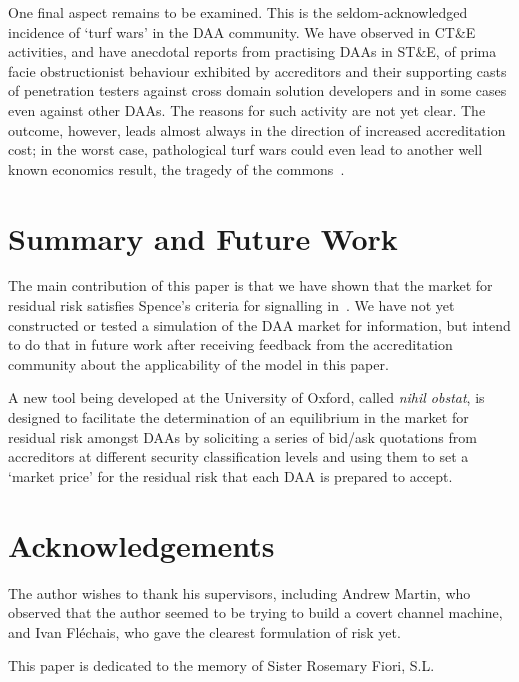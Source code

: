 \documentclass{llncs}
\begin{document}
One final aspect remains to be examined.  This is the seldom-acknowledged
incidence of `turf wars' in the DAA community.  We have
observed in CT\&E activities, and have anecdotal reports from
practising DAAs in ST\&E, of prima facie obstructionist behaviour exhibited
by accreditors and their supporting casts of penetration testers
against cross domain solution developers and in some cases even against other DAAs.
The reasons for such activity are not yet clear.  The outcome, however,
leads almost always in the direction of increased accreditation cost; in
the worst case, pathological turf wars could even lead to another well known
economics result, the tragedy of the commons~\cite{Hardin1968}.

\section{Summary and Future Work}

The main contribution of this paper is that we have shown
that the market for residual risk satisfies Spence's criteria for signalling
in~\cite{Spence1973}.  We have not yet constructed or tested a simulation
of the DAA market for information, but intend to do that in future work
after receiving feedback from the accreditation community about the
applicability of the model in this paper.

A new tool being developed at the University of Oxford, called {\it nihil obstat},
is designed to facilitate the determination of an equilibrium in the market for
residual risk amongst DAAs by soliciting a series of bid/ask quotations from
accreditors at different security classification levels and using them to set a
`market price' for the residual risk that each DAA is prepared to accept.


\section*{Acknowledgements}

The author wishes to thank his supervisors, including Andrew Martin, who observed
that the author seemed to be trying to build a covert channel machine, and Ivan
Fl\'echais, who gave the clearest formulation of risk yet.

This paper is dedicated to the memory of Sister Rosemary Fiori, S.L.


\end{document}
